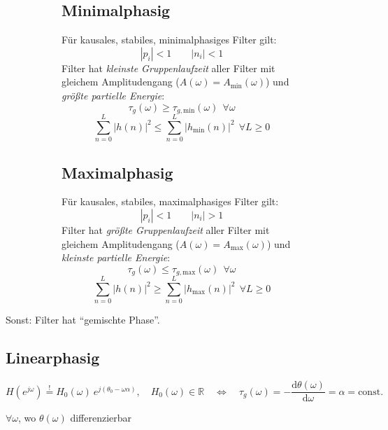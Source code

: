 \documentclass[10pt,a4paper]{article}
\begin{document}
\begin{figure}[H]
	\centering
	\begin{subfigure}[t]{0.48\textwidth}
		\subsection*{Minimalphasig}
		Für kausales, stabiles, minimalphasiges Filter gilt:
		\[
			|p_i| < 1 \qquad |n_i| < 1
		\]
		Filter hat \textit{kleinste Gruppenlaufzeit} aller Filter mit gleichem Amplitudengang ($A(\omega) = A_{\mathrm{min}}(\omega)$) und \textit{größte partielle Energie}:
		\[
			\tau_g(\omega) \geq \tau_{g, \mathrm{min}}(\omega) ~~ \forall \omega
		\]
		\[
			\sum_{n = 0}^L |h(n)|^2 \leq \sum_{n = 0}^L |h_{\mathrm{min}}(n)|^2 ~~ \forall L \geq 0
		\]
	\end{subfigure}
	\hspace{0.02\textwidth}
	\begin{subfigure}[t]{0.48\textwidth}
		\subsection*{Maximalphasig}
		Für kausales, stabiles, maximalphasiges Filter gilt:
		\[
			|p_i| < 1 \qquad |n_i| > 1
		\]
		Filter hat \textit{größte Gruppenlaufzeit} aller Filter mit gleichem Amplitudengang ($A(\omega) = A_{\mathrm{max}}(\omega)$) und \textit{kleinste partielle Energie}:
		\[
			\tau_g(\omega) \leq \tau_{g, \mathrm{max}}(\omega) ~~ \forall \omega
		\]
		\[
			\sum_{n = 0}^L |h(n)|^2 \geq \sum_{n = 0}^L |h_{\mathrm{max}}(n)|^2 ~~ \forall L \geq 0
		\]
	\end{subfigure}
\end{figure}
\raggedright
Sonst: Filter hat ``gemischte Phase''.

\subsection*{Linearphasig}
\[
	H(e^{j\omega}) \overset{!}{=} H_0(\omega) ~ e^{j (\theta_0 - \omega \alpha)}, \quad H_0(\omega) \in \mathbb R
	\quad \Longleftrightarrow \quad
	\tau_g(\omega) = -\frac{\mathrm d \theta(\omega)}{\mathrm d\omega} = \alpha = \mathrm{const.}
\]
\begin{center}
	$\forall \omega$, wo $\theta(\omega)$ differenzierbar
\end{center}
\end{document}
